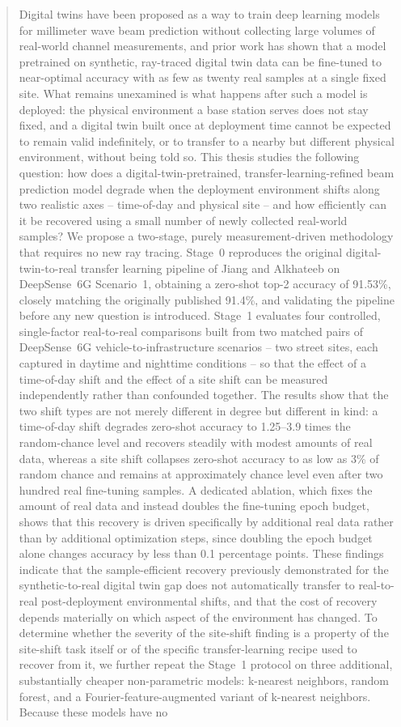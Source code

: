 \documentclass{iutbscthesis}
\begin{document}
\begin{abstract}
Digital twins have been proposed as a way to train deep learning models for millimeter wave beam prediction without collecting large volumes of real-world channel measurements, and prior work has shown that a model pretrained on synthetic, ray-traced digital twin data can be fine-tuned to near-optimal accuracy with as few as twenty real samples at a single fixed site. What remains unexamined is what happens after such a model is deployed: the physical environment a base station serves does not stay fixed, and a digital twin built once at deployment time cannot be expected to remain valid indefinitely, or to transfer to a nearby but different physical environment, without being told so. This thesis studies the following question: how does a digital-twin-pretrained, transfer-learning-refined beam prediction model degrade when the deployment environment shifts along two realistic axes -- time-of-day and physical site -- and how efficiently can it be recovered using a small number of newly collected real-world samples? We propose a two-stage, purely measurement-driven methodology that requires no new ray tracing. Stage~0 reproduces the original digital-twin-to-real transfer learning pipeline of Jiang and Alkhateeb on DeepSense~6G Scenario~1, obtaining a zero-shot top-2 accuracy of 91.53\%, closely matching the originally published 91.4\%, and validating the pipeline before any new question is introduced. Stage~1 evaluates four controlled, single-factor real-to-real comparisons built from two matched pairs of DeepSense~6G vehicle-to-infrastructure scenarios -- two street sites, each captured in daytime and nighttime conditions -- so that the effect of a time-of-day shift and the effect of a site shift can be measured independently rather than confounded together. The results show that the two shift types are not merely different in degree but different in kind: a time-of-day shift degrades zero-shot accuracy to 1.25--3.9 times the random-chance level and recovers steadily with modest amounts of real data, whereas a site shift collapses zero-shot accuracy to as low as 3\% of random chance and remains at approximately chance level even after two hundred real fine-tuning samples. A dedicated ablation, which fixes the amount of real data and instead doubles the fine-tuning epoch budget, shows that this recovery is driven specifically by additional real data rather than by additional optimization steps, since doubling the epoch budget alone changes accuracy by less than 0.1 percentage points. These findings indicate that the sample-efficient recovery previously demonstrated for the synthetic-to-real digital twin gap does not automatically transfer to real-to-real post-deployment environmental shifts, and that the cost of recovery depends materially on which aspect of the environment has changed. To determine whether the severity of the site-shift finding is a property of the site-shift task itself or of the specific transfer-learning recipe used to recover from it, we further repeat the Stage~1 protocol on three additional, substantially cheaper non-parametric models: k-nearest neighbors, random forest, and a Fourier-feature-augmented variant of k-nearest neighbors. Because these models have no 
\end{abstract}
\end{document}
